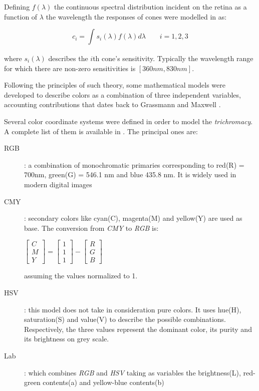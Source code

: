 \documentclass[../main.tex]{subfiles}
\begin{document}
Defining $f(\lambda)$ the continuous spectral distribution incident on the retina as a function of $\lambda$ the wavelength the responses of cones were modelled in \cite{colors-images} as:

\begin{equation}
   c_{i} = \int_{}^{} s_{i}(\lambda)f(\lambda)d\lambda   \qquad i=1,2,3
\end{equation}

where $s_{i}(\lambda)$ describes the $i$th cone's sensitivity. Typically the wavelength range for which there are non-zero sensitivities is $[360 nm, 830 nm]$.



Following the principles of such theory, some mathematical models were developed to describe colors as a combination of three independent variables, accounting contributions that dates back to Grassmann \cite{grassmann1854theory} and Maxwell \cite{maxwell1856theory}.

Several color coordinate systems were defined in order to model the \textit{trichromacy}. A complete list of them is available in \cite{jain1989fundamentals}. The principal ones are:

\begin{description}
    \item[RGB]: a combination of monochromatic primaries corresponding to red(R) = 700nm,
    green(G) = 546.1 nm and blue 435.8 nm. It is widely used in modern digital images
    \item[CMY]: secondary colors like cyan(C), magenta(M) and yellow(Y) are used as base. The conversion from \textit{CMY} to \textit{RGB} is: 
    
    \begin{center}
    \begin{math}
    \begin{bmatrix}
    C \\ M \\ Y
    \end{bmatrix} = \begin{bmatrix}
    1 \\ 1 \\ 1
    \end{bmatrix} - 
    \begin{bmatrix}
    R \\ G \\ B
    \end{bmatrix}
    \end{math}
    \end{center}
    
    assuming the values normalized to 1.
    \item[HSV]: this model does not take in consideration pure colors. It uses hue(H), saturation(S) and value(V) to describe the possible combinations. Respectively, the three values represent the dominant color, its purity and its brightness on grey scale.
    \item[Lab]: which combines \textit{RGB} and \textit{HSV} taking as variables the brightness(L), red-green contents(a) and yellow-blue contents(b)
\end{description}
\end{document}
